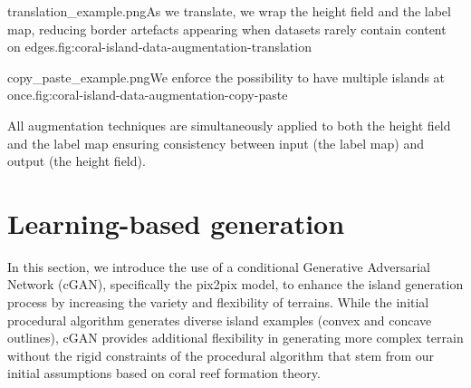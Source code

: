 \begin{Itemize}
    {translation_example.png}{As we translate, we wrap the height field and the label map, reducing border artefacts appearing when datasets rarely contain content on edges.}{fig:coral-island-data-augmentation-translation}

    {copy_paste_example.png}{We enforce the possibility to have multiple islands at once.}{fig:coral-island-data-augmentation-copy-paste}


\end{Itemize}

All augmentation techniques are simultaneously applied to both the height field and the label map ensuring consistency between input (the label map) and output (the height field).

\section{Learning-based generation}
\label{sec:coral-island-cGAN-training}

In this section, we introduce the use of a conditional Generative Adversarial Network (cGAN), specifically the pix2pix model, to enhance the island generation process by increasing the variety and flexibility of terrains. While the initial procedural algorithm generates diverse island examples (convex and concave outlines), cGAN provides additional flexibility in generating more complex terrain without the rigid constraints of the procedural algorithm that stem from our initial assumptions based on coral reef formation theory.

